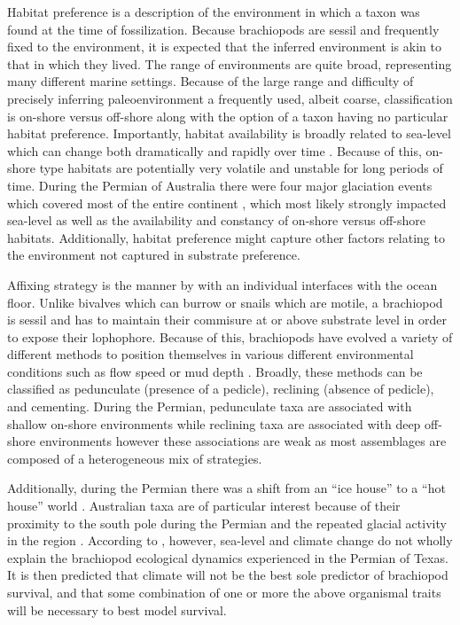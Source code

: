\documentclass[12pt,letterpaper]{article}
\begin{document}
Habitat preference is a description of the environment in which a taxon was found at the time of fossilization. Because brachiopods are sessil and frequently fixed to the environment, it is expected that the inferred environment is akin to that in which they lived. The range of environments are quite broad, representing many different marine settings. Because of the large range and difficulty of precisely inferring paleoenvironment a frequently used, albeit coarse, classification is on-shore versus off-shore \citep{Sepkoski1991,Kiessling2007a,Bottjer1988,Jablonski1991,Jablonski1983b} along with the option of a taxon having no particular habitat preference. Importantly, habitat availability is broadly related to sea-level which can change both dramatically and rapidly over time \citep{Olszewski2004}. Because of this, on-shore type habitats are potentially very volatile and unstable for long periods of time. During the Permian of Australia there were four major glaciation events which covered most of the entire continent \citep{Fielding2008,Birgenheier2010,Fielding2008a,Fielding2006}, which most likely strongly impacted sea-level as well as the availability and constancy of on-shore versus off-shore habitats. Additionally, habitat preference might capture other factors relating to the environment not captured in substrate preference. 

Affixing strategy is the manner by with an individual interfaces with the ocean floor. Unlike bivalves which can burrow or snails which are motile, a brachiopod is sessil and has to maintain their commisure at or above substrate level in order to expose their lophophore. Because of this, brachiopods have evolved a variety of different methods to position themselves in various different environmental conditions such as flow speed or mud depth \citep{Rudwick1970,Alexander1977,LaBarbera1978,LaBarbera1981,Richardson1997}. Broadly, these methods can be classified as pedunculate (presence of a pedicle), reclining (absence of pedicle), and cementing. During the Permian, pedunculate taxa are associated with shallow on-shore environments while reclining taxa are associated with deep off-shore environments \citep{Clapham2007} however these associations are weak as most assemblages are composed of a heterogeneous mix of strategies.

Additionally, during the Permian there was a shift from an ``ice house'' to a ``hot house'' world \citep{Fielding2006,Birgenheier2010,Jones2006,Powell2007,Fielding2008}. Australian taxa are of particular interest because of their proximity to the south pole during the Permian and the repeated glacial activity in the region \citep{Fielding2008a,Fielding2006,Birgenheier2010,Jones2006}. According to \citet{Olszewski2004}, however, sea-level and climate change do not wholly explain the brachiopod ecological dynamics experienced in the Permian of Texas. It is then predicted that climate will not be the best sole predictor of brachiopod survival, and that some combination of one or more the above organismal traits will be necessary to best model survival. 
\end{document}
